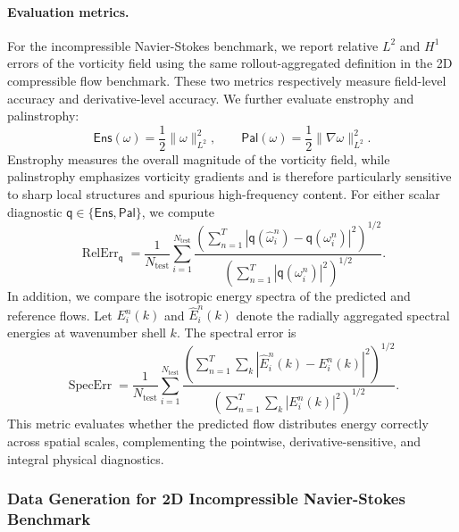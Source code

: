 \documentclass[11pt]{article}
\begin{document}
\paragraph{Evaluation metrics.} For the incompressible Navier-Stokes benchmark, we report relative $L^2$ and $H^1$ errors of the vorticity field using the same rollout-aggregated definition in the 2D compressible flow benchmark. These two metrics respectively measure field-level accuracy and derivative-level accuracy. We further evaluate enstrophy and palinstrophy:
\[
    \mathsf{Ens}(\omega)
    =
    \frac12\|\omega\|_{L^2}^2,
    \qquad
    \mathsf{Pal}(\omega)
    =
    \frac12\|\nabla\omega\|_{L^2}^2.
\]
Enstrophy measures the overall magnitude of the vorticity field, while palinstrophy emphasizes vorticity gradients and is therefore particularly sensitive to sharp local structures and spurious high-frequency content. For either scalar diagnostic $\mathsf{q}\in\{\mathsf{Ens},\mathsf{Pal}\}$, we compute
\[
    \operatorname{RelErr}_\mathsf{q}
    =
    \frac{1}{N_{\mathrm{test}}}
    \sum_{i=1}^{N_{\mathrm{test}}}
    \frac{
        \left(
            \sum_{n=1}^{T}
            |\mathsf{q}(\widehat\omega_i^n)-\mathsf{q}(\omega_i^n)|^2
        \right)^{1/2}
    }{
        \left(
            \sum_{n=1}^{T}
            |\mathsf{q}(\omega_i^n)|^2
        \right)^{1/2}
    }.
\]
In addition, we compare the isotropic energy spectra of the predicted and reference flows. Let $E_i^n(k)$ and $\widehat E_i^n(k)$ denote the radially aggregated spectral energies at wavenumber shell $k$. The spectral error is
\[
    \operatorname{SpecErr}
    =
    \frac{1}{N_{\mathrm{test}}}
    \sum_{i=1}^{N_{\mathrm{test}}}
    \frac{
        \left(
            \sum_{n=1}^{T}
            \sum_k
            |\widehat E_i^n(k)-E_i^n(k)|^2
        \right)^{1/2}
    }{
        \left(
            \sum_{n=1}^{T}
            \sum_k
            |E_i^n(k)|^2
        \right)^{1/2}
    }.
\]
This metric evaluates whether the predicted flow distributes energy correctly across spatial scales, complementing the pointwise, derivative-sensitive, and integral physical diagnostics.

\subsubsection{Data Generation for 2D Incompressible Navier-Stokes Benchmark}
\label{app:ns2d_data_generation}
\end{document}
